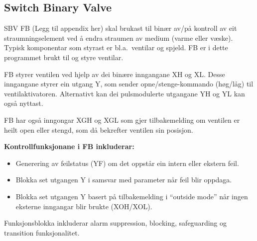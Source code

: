 \newpage

\subsection{Switch Binary Valve}

\gls{SBV} \gls{FB} (Legg til appendix her) skal brukast til binær av/på kontroll av eit straumningselement ved å endra straumen av medium (varme eller væske). 
Typisk komponentar som styrast er bl.a.\ ventilar og spjeld.
\gls{FB} er i dette programmet brukt til og styre ventilar.

\gls{FB} styrer ventilen ved hjelp av dei binære inngangane XH og XL.\@
Desse inngangane styrer ein utgang Y, som sender opne/stenge-kommando (høg/låg) til ventilaktivatoren.
Alternativt kan dei pulsmodulerte utgangane YH og YL kan også nyttast.

\gls{FB} har også inngongar XGH og XGL som gjer tilbakemelding om ventilen er heilt open eller stengd,
som då bekrefter ventilen sin posisjon.

\textbf{Kontrollfunksjonane i \gls{FB} inkluderar:}
\begin{itemize}
    \item Generering av feilstatus (YF) om det oppstår ein intern eller ekstern feil.
    \item Blokka set utgangen Y i samsvar med parameter når feil blir oppdaga.
    \item Blokka set utgangen Y basert på tilbakemelding i ``outside mode'' når ingen eksterne inngangar blir brukte (XOH/XOL).
\end{itemize}

Funksjonsblokka inkluderar alarm suppression, blocking, safeguarding og transition funksjonalitet.

